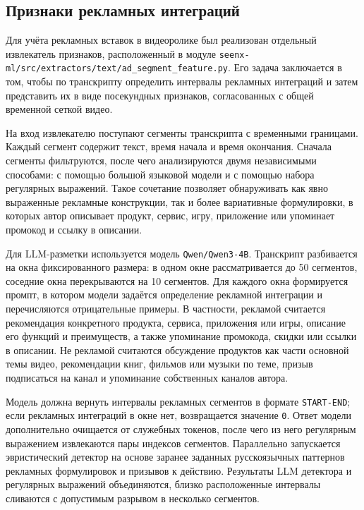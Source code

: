 \documentclass[times]{itmo-student-thesis}
\begin{document}
\subsection{Признаки рекламных интеграций}

Для учёта рекламных вставок в видеоролике был реализован отдельный извлекатель признаков, расположенный в модуле \texttt{seenx-ml/src/extractors/text/ad\_segment\_feature.py}. Его задача заключается в том, чтобы по транскрипту определить интервалы рекламных интеграций и затем представить их в виде посекундных признаков, согласованных с общей временной сеткой видео.

На вход извлекателю поступают сегменты транскрипта с временными границами. Каждый сегмент содержит текст, время начала и время окончания. Сначала сегменты фильтруются, после чего анализируются двумя независимыми способами: с помощью большой языковой модели и с помощью набора регулярных выражений. Такое сочетание позволяет обнаруживать как явно выраженные рекламные конструкции, так и более вариативные формулировки, в которых автор описывает продукт, сервис, игру, приложение или упоминает промокод и ссылку в описании.

Для LLM-разметки используется модель \texttt{Qwen/Qwen3-4B}. Транскрипт разбивается на окна фиксированного размера: в одном окне рассматривается до 50 сегментов, соседние окна перекрываются на 10 сегментов. Для каждого окна формируется промпт, в котором модели задаётся определение рекламной интеграции и перечисляются отрицательные примеры. В частности, рекламой считается рекомендация конкретного продукта, сервиса, приложения или игры, описание его функций и преимуществ, а также упоминание промокода, скидки или ссылки в описании. Не рекламой считаются обсуждение продуктов как части основной темы видео, рекомендации книг, фильмов или музыки по теме, призыв подписаться на канал и упоминание собственных каналов автора.

Модель должна вернуть интервалы рекламных сегментов в формате \texttt{START-END}; если рекламных интеграций в окне нет, возвращается значение \texttt{0}. Ответ модели дополнительно очищается от служебных токенов, после чего из него регулярным выражением извлекаются пары индексов сегментов. Параллельно запускается эвристический детектор на основе заранее заданных русскоязычных паттернов рекламных формулировок и призывов к действию. Результаты LLM детектора и регулярных выражений объединяются, близко расположенные интервалы сливаются с допустимым разрывом в несколько сегментов.
\end{document}
